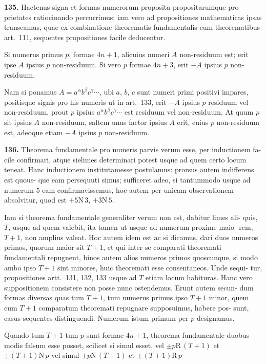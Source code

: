 \documentclass[12pt,a4paper]{article}
\newcommand{\R}{\mbox{R}}
\newcommand{\N}{\mbox{N}}
\begin{document}
\textbf{135.}
Hactenus signa et formas numerorum proposita propositarumque pro-
prietates ratiocinando percurrimus; iam vero ad propositiones mathematicas ipsas
transeamus, quae ex combinatione theorematis fundamentalis cum theorematibus
art.~111, sequentes propositiones facile deducentur.

Si numerus primus $p$, formae $4n+1$, alicuius numeri $A$ non-residuum
est; erit ipse $A$ ipsius $p$ non-residuum. Si vero $p$ formae $4n+3$, erit $-A$
ipsius $p$ non-residuum.

Nam si ponamus $A = a^{\alpha} b^{\beta} c^{\gamma} \cdots$, ubi $a$, $b$, $c$ sunt numeri primi
positivi impares, positisque signis pro his numeris ut in art.~133, erit $-A$ ipsius
$p$ residuum vel non-residuum, prout $p$ ipsius $a^{\alpha} b^{\beta} c^{\gamma} \cdots$ est residuum vel
non-residuum. At quum $p$ sit ipsius $A$ non-residuum, saltem unus factor ipsius
$A$ erit, cuius $p$ non-residuum est, adeoque etiam $-A$ ipsius $p$ non-residuum.

\textbf{136.}
Theorema fundamentale pro numeris parvis verum esse, per inductionem fa-
cile confirmari, atque sielimes determinari potest usque ad quem certo locum teneat.
Hanc inductionem institutamesse postulamus: prorsus autem indifferens est quous-
que eam persequuti simus; sufficeret adeo, si tantummodo usque ad numerum $5$
eam confirmavissemus, hoc autem per unicam observationem absolvitur, quod est
$+5 \N\, 3$, $+3 \N\, 5$.

Iam si theorema fundamentale generaliter verum non est, dabitur limes ali-
quis, $T$, usque ad quem valebit, ita tamen ut usque ad numerum proxime maio-
rem, $T+1$, non amplius valeat. Hoc autem idem est ac si dicamus, dari duos
numeros primos, quorum maior sit $T+1$, et qui inter se comparati theoremati
fundamentali repugnent, binos autem alios numeros primos quoscunque, si modo
ambo ipso $T+1$ sint minores, huic theoremati esse consentaneos. Unde sequi-
tur, propositiones artt.~131, 132, 133 usque ad $T$ etiam locum habituras. Hanc
vero suppositionem consistere non posse nunc ostendemus. Erunt autem secun-
dum formas diversas quas tum $T+1$, tum numerus primus ipso $T+1$ minor,
quem cum $T+1$ comparatum theoremati repugnare supposuimus, habere pos-
sunt, casus sequentes distinguendi. Numerum istum primum per $p$ designamus.

Quando tum $T+1$ tum $p$ sunt formae $4n+1$, theorema fundamentale
duobus modis falsum esse posset, scilicet si simul esset,
vel $\pm p \R\, (T+1)$ et $\pm(T+1) \N\, p$
vel simul $\pm p \N\, (T+1)$ et $\pm(T+1) \R\, p$
\end{document}
